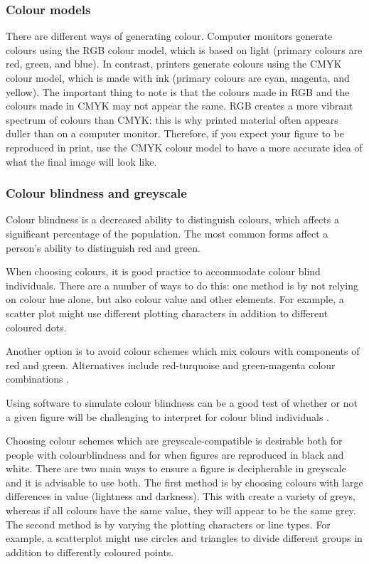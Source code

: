 \documentclass[letterpaper]{article}
\begin{document}
\subsubsection{Colour models}
There are different ways of generating colour. Computer monitors generate colours using the RGB colour model, which is based on light (primary colours are red, green, and blue). In contrast, printers generate colours using the CMYK colour model, which is made with ink (primary colours are cyan, magenta, and yellow). The important thing to note is that the colours made in RGB and the colours made in CMYK may not appear the same. RGB creates a more vibrant spectrum of colours than CMYK: this is why printed material often appears duller than on a computer monitor. Therefore, if you expect your figure to be reproduced in print, use the CMYK colour model to have a more accurate idea of what the final image will look like.

\subsubsection{Colour blindness and greyscale}
Colour blindness is a decreased ability to distinguish colours, which affects a significant percentage of the population. The most common forms affect a person's ability to distinguish red and green.

When choosing colours, it is good practice to accommodate colour blind individuals. There are a number of ways to do this: one method is by not relying on colour hue alone, but also colour value and other elements. For example, a scatter plot might use different plotting characters in addition to different coloured dots. 

Another option is to avoid colour schemes which mix colours with components of red and green. Alternatives include red-turquoise and green-magenta colour combinations \cite{wong4}.

Using software to simulate colour blindness can be a good test of whether or not a given figure will be challenging to interpret for colour blind individuals \cite{wong4}.

Choosing colour schemes which are greyscale-compatible is desirable both for people with colourblindness and for when figures are reproduced in black and white. There are two main ways to ensure a figure is decipherable in greyscale and it is advisable to use both. The first method is by choosing colours with large differences in value (lightness and darkness). This with create a variety of greys, whereas if all colours have the same value, they will appear to be the same grey. The second method is by varying the plotting characters or line types. For example, a scatterplot might use circles and triangles to divide different groups in addition to differently coloured points. 
\end{document}
